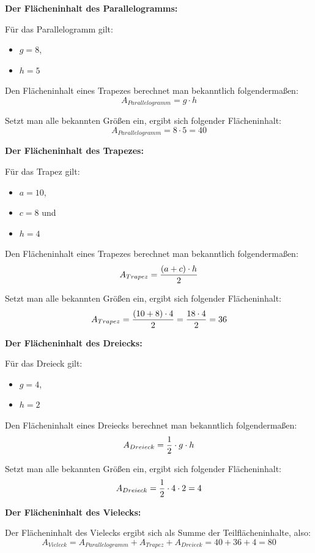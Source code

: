 \documentclass[
  ngerman,
]{book}
\providecommand{\tightlist}{%
  \setlength{\itemsep}{0pt}\setlength{\parskip}{0pt}}
\begin{document}
\textbf{Der Flächeninhalt des Parallelogramms:}

Für das Parallelogramm gilt:

\begin{itemize}
\tightlist
\item
  \(g= 8\),
\item
  \(h = 5\)
\end{itemize}

Den Flächeninhalt eines Trapezes berechnet man bekanntlich folgendermaßen:
\[A_{Parallelogramm} = g \cdot h\]

Setzt man alle bekannten Größen ein, ergibt sich folgender Flächeninhalt:
\[ A_{Parallelogramm} = 8 \cdot 5 = 40\]

\textbf{Der Flächeninhalt des Trapezes:}

Für das Trapez gilt:

\begin{itemize}
\tightlist
\item
  \(a= 10\),
\item
  \(c= 8\) und
\item
  \(h = 4\)
\end{itemize}

Den Flächeninhalt eines Trapezes berechnet man bekanntlich folgendermaßen:
\[A_{Trapez} = {(a+c) \cdot h \over 2}\]

Setzt man alle bekannten Größen ein, ergibt sich folgender Flächeninhalt:
\[ A_{Trapez} = {(10 + 8) \cdot 4  \over 2} = {18 \cdot 4 \over 2} = 36\]

\textbf{Der Flächeninhalt des Dreiecks:}

Für das Dreieck gilt:

\begin{itemize}
\tightlist
\item
  \(g= 4\),
\item
  \(h = 2\)
\end{itemize}

Den Flächeninhalt eines Dreiecks berechnet man bekanntlich folgendermaßen:
\[A_{Dreieck} = {1 \over 2} \cdot g \cdot h\]

Setzt man alle bekannten Größen ein, ergibt sich folgender Flächeninhalt:
\[ A_{Dreieck} = {1 \over 2} \cdot 4 \cdot 2 = 4\]

\textbf{Der Flächeninhalt des Vielecks:}

Der Flächeninhalt des Vielecks ergibt sich als Summe der Teilflächeninhalte, also:
\[A_{Vieleck} = A_{Parallelogramm} + A_{Trapez} + A_{Dreieck} = 40+36+4 = 80\]
\end{document}
